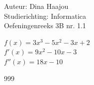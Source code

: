 \documentclass[a4paper]{article}
\begin{document}
\noindent \large Auteur: Dina Haajou \\
\noindent \large Studierichting: Informatica \\
\noindent \large Oefeningenreeks 3B nr. 1.1 \\

\medskip

\normalsize

$f(x) = 3x^3 - 5x^2 - 3x + 2$ \\

$f'(x) = 9x^2 - 10x - 3$ \\

$f''(x) = 18x - 10$ \\

\begin{thebibliography}{999}
\end{thebibliography}
\end{document}
